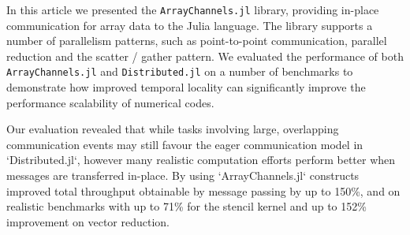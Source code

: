 In this article we presented the \texttt{ArrayChannels.jl} library, providing in-place communication for array data to the Julia language. The library supports a number of parallelism patterns, such as point-to-point communication, parallel reduction and the scatter / gather pattern. We evaluated the performance of both \texttt{ArrayChannels.jl} and \texttt{Distributed.jl} on a number of benchmarks to demonstrate how improved temporal locality can significantly improve the performance scalability of numerical codes.

Our evaluation revealed that while tasks involving large, overlapping communication events may still favour the eager communication model in `Distributed.jl`, however many realistic computation efforts perform better when messages are transferred in-place. By using `ArrayChannels.jl` constructs improved total throughput obtainable by message passing by up to 150\%, and on realistic benchmarks with up to 71\% for the stencil kernel and up to 152\% improvement on vector reduction.